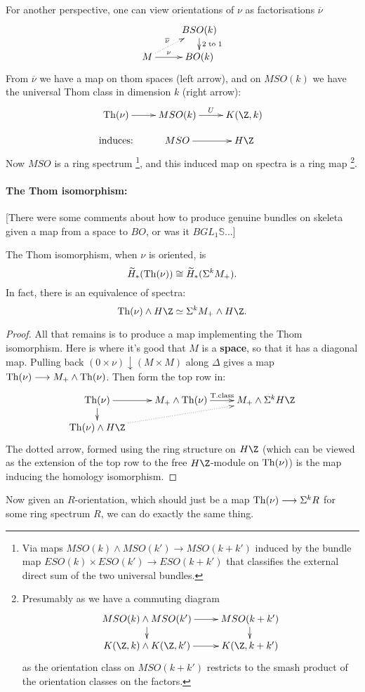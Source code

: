 \documentclass[11pt]{article}
\begin{document}
For another perspective, one can view orientations of $\nu$ as factorisations $\overline{\nu}$
\[
\xymatrix@R=4mm{
&%
BSO(k)
\ar[d]^-{\textup{2 to 1}}
\\%
M
\ar@{..>}[ur]^-{\overline{\nu}}
\ar[r]^-{\nu}
&%
BO(k)%
}\]
From $\overline{\nu}$ we have a map on thom spaces (left arrow), and on $MSO(k)$ we have the universal Thom class in dimension $k$ (right arrow):
\[\xymatrix@R=4mm{
\Thom(\nu)
\ar[r]
&%
MSO(k)
\ar[r]^-{U}
&%
K(\Z,k)\\%
\makebox[0cm][c]{induces:}&%
MSO
\ar[r]
&%
H\Z%
}\]
Now $MSO$ is a ring spectrum%
\footnote{Via maps $MSO(k)\wedge MSO(k')\to MSO(k+k')$ induced by the bundle map $ESO(k)\times ESO(k')\to ESO(k+k')$ that classifies the external direct sum of the two universal bundles.}, and this induced map on spectra is a ring map%
\footnote{Presumably as we have a commuting diagram
\[\xymatrix@R=4mm{
MSO(k)\wedge MSO(k')
\ar[r]
\ar[d]
&%
MSO(k+k')
\ar[d]
\\%
K(\Z,k)\wedge K(\Z,k')
\ar[r]
&%
K(\Z,k+k')%
}\] as the orientation class on $MSO(k+k')$ restricts to the smash product of the orientation classes on the factors.}.
\paragraph*{The Thom isomorphism:} 
[There were some comments about how to produce genuine bundles on skeleta given a map from a space to $BO$, or was it $BGL_1\mathbb{S}$...]

The Thom isomorphism, when $\nu$ is oriented, is
\[\widetilde{H}_{*}(\operatorname{Th}(\nu))\cong\widetilde{H}_{*}(\Sigma^kM_+).\]
In fact, there is an equivalence of spectra: 
\[\Thom(\nu)\wedge H\Z\simeq \Sigma^k M_+\wedge H\Z.\]
\begin{proof}
All that remains is to produce a map implementing the Thom isomorphism. Here is where it's good that $M$ is a \textbf{space}, so that it has a diagonal map. Pulling back $(0\times \nu)\downarrow(M\times M)$ along $\Delta$ gives a map $\operatorname{Th}(\nu)\longrightarrow M_+\wedge \operatorname{Th}(\nu)$. Then form the top row in:
\[\xymatrix@R=4mm{
\Thom(\nu)
\ar[r]
\ar[d]
&%
M_+\wedge \Thom(\nu)
\ar[r]^-{\textup{T.class}}
&%
M_+\wedge \Sigma^kH\Z
\\%
\Thom(\nu)\wedge H\Z\ar@{..>}[rru]
&%
&%
}\]
The dotted arrow, formed using the ring structure on $H\Z$ (which can be viewed as the extension of the top row to the free $H\Z$-module on $\operatorname{Th}(\nu)$) is the map inducing the homology isomorphism.
\end{proof}
Now given an $R$-orientation, which should just be a map $\operatorname{Th}(\nu)\longrightarrow\Sigma^kR$ for some ring spectrum $R$,  we can do exactly the same thing.
\end{document}
